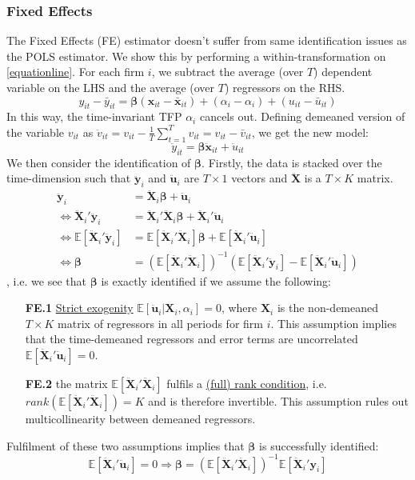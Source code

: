 \subsubsection*{Fixed Effects}
The Fixed Effects (FE) estimator doesn't suffer from same identification issues as the POLS estimator. We show this by performing a within-transformation on \eqref{equationline}. For each firm $i$, we subtract the average (over $T$) dependent variable  on the LHS and the average (over $T$) regressors on the RHS.
$$y_{it}-\bar{y}_{it} = \pmb{\beta}(\pmb{x}_{it}-\bar{\pmb{x}}_{it})+(\alpha_i-\alpha_i)+(u_{it} - \bar{u}_{it})$$
In this way, the time-invariant TFP $\alpha_i$ cancels out. Defining demeaned version of the variable $v_{it}$ as $\ddot{v}_{it}=v_{it}-\frac{1}{T}\sum_{t=1}^T {v_{it}}=v_{it}-\bar{v}_{it}$, we get the new model:
$$\ddot{y}_{it} = \pmb{\beta} \ddot{\pmb{x}}_{it}+\ddot{u}_{it}$$
We then consider the identification of $\pmb{\beta}$. Firstly, the data is stacked over the time-dimension such that $\ddot{\pmb{y}}_{i}$ and $\ddot{\pmb{u}}_{i}$ are $T \times 1$ vectors and $\pmb{\ddot{X}}$ is a $T\times K$ matrix.
\begin{align*}
    \ddot{\pmb{y}}_{i} &= \pmb{\ddot{X}}_{i} \pmb{\beta}  +\pmb{\ddot{u}}_{i} \\
    \Leftrightarrow \pmb{\ddot{X}}_{i}'\ddot{\pmb{y}}_{i}&=\pmb{\ddot{X}}_{i}'\pmb{\ddot{X}}_{i}\pmb{\beta} +\pmb{\ddot{X}}_{i}'\pmb{\ddot{u}}_{i} \\
    \Leftrightarrow \mathbb{E}[\pmb{\ddot{X}}_{i}'\pmb{\ddot{y}}_{i}] &=\mathbb{E}[\pmb{\ddot{X}}_{i}'\pmb{\ddot{X}}_{i}] \pmb{\beta}  + \mathbb{E}[\pmb{\ddot{X}}_{i}'\pmb{\ddot{u}}_{i}] \\ \Leftrightarrow  \pmb{\beta} &= (\mathbb{E}[\pmb{\ddot{X}}_{i}'\pmb{\ddot{X}}_{i}])^{-1} \left(  \mathbb{E}[\pmb{\ddot{X}}_{i}'\pmb{\ddot{y}}_{i}]-\mathbb{E}[\pmb{\ddot{X}}_{i}' \pmb{\ddot{u}}_{i}]\right)
\end{align*}
, i.e. we see that $\pmb{\beta}$ is exactly identified if we assume the following:
\begin{enumerate}
    \item[\textbf{FE.1}] \underline{Strict exogenity} $\mathbb{E}[\pmb{\ddot{u}}_{i}\vert \pmb{X}_i,\alpha_i]=0$, where $\pmb{X}_i$ is the non-demeaned $T \times K$ matrix of regressors in all periods for firm $i$.
    This assumption implies that the time-demeaned regressors and error terms are uncorrelated $\mathbb{E}[\pmb{\ddot{X}}_{i}' \pmb{\ddot{u}}_{i}]=0$.
    \item[\textbf{FE.2}] the matrix $\mathbb{E}[\pmb{\ddot{X}}_{i}'\pmb{\ddot{X}}_{i}]$ fulfils a \underline{ (full) rank condition}, i.e. $rank(\mathbb{E}[\pmb{\ddot{X}}_{i}'\pmb{\ddot{X}}_{i}])=K$ and is therefore invertible. This assumption rules out multicollinearity between demeaned regressors.
\end{enumerate}
Fulfilment of these two assumptions implies that $\pmb{\beta}$ is successfully identified:
$$\mathbb{E}[\pmb{\ddot{X}}_{i}' \pmb{\ddot{u}}_{i}]= 0\Rightarrow \pmb{\beta} = (\mathbb{E}[\pmb{\ddot{X}}_{i}'\pmb{\ddot{X}}_{i}])^{-1} \mathbb{E}[\pmb{\ddot{X}}_{i}'\pmb{y}_{i}]$$

